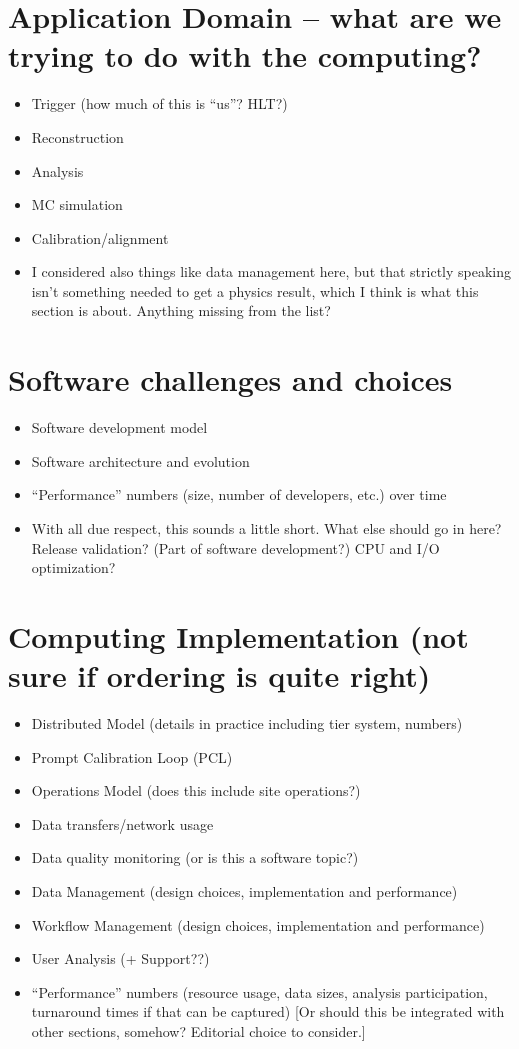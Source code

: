 \documentclass [draft,notitlepage] {article}
\begin{document}
\section{Application Domain -- what are we trying to do with the computing?}
\begin{itemize}
\item Trigger (how much of this is ``us''?  HLT?)
\item Reconstruction
\item Analysis
\item MC simulation
\item Calibration/alignment
\item I considered also things like data management here, but that strictly speaking isn't something needed to get a physics result, which I think is what this section is about.  Anything missing from the list?
\end{itemize}


\section{Software challenges and choices}
\begin{itemize}
\item Software development model
\item Software architecture and evolution
\item ``Performance'' numbers (size, number of developers, etc.) over time
\item With all due respect, this sounds a little short.  What else should go in here?  Release validation?  (Part of software development?)  CPU and I/O optimization?
\end{itemize}


\section{Computing Implementation (not sure if ordering is quite right)}
\begin{itemize}
\item Distributed Model (details in practice including tier system, numbers)
\item Prompt Calibration Loop (PCL)
\item Operations Model (does this include site operations?)
\item Data transfers/network usage
\item Data quality monitoring (or is this a software topic?)
\item Data Management (design choices, implementation and performance)
\item Workflow Management (design choices, implementation and performance)
\item User Analysis (+ Support??)
\item ``Performance'' numbers (resource usage, data sizes, analysis participation, turnaround times if that can be captured) [Or should this be integrated with other sections, somehow?  Editorial choice to consider.]
\end{itemize}
\end{document}
